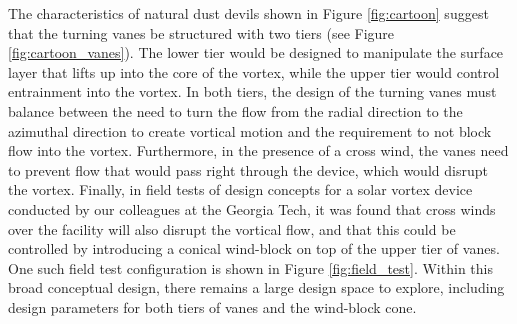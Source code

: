 

The characteristics of natural dust devils shown in Figure
\ref{fig:cartoon} suggest that the turning vanes be structured with two
tiers (see Figure \ref{fig:cartoon_vanes}). The lower tier would be
designed to manipulate the surface layer 
that lifts up into the core of the vortex, while the upper tier would
control entrainment into the vortex. In both tiers, the design of the
turning vanes must balance between the need to turn the flow from the
radial direction to the azimuthal direction to create vortical motion
and the requirement to not block flow into the vortex. Furthermore, in
the presence of a cross wind, the vanes need to prevent flow that
would pass right through the device, which would disrupt the vortex.
Finally, in field tests of design concepts for a solar vortex device
conducted by our colleagues at the Georgia Tech, it was found that cross
winds over the facility will also disrupt the vortical flow, and that
this could be controlled by introducing a conical wind-block on top of
the upper tier of vanes. One such field test configuration is shown in
Figure \ref{fig:field_test}. Within this broad conceptual design, there
remains a large design space to explore, including design parameters for
both tiers of vanes and the wind-block cone.


